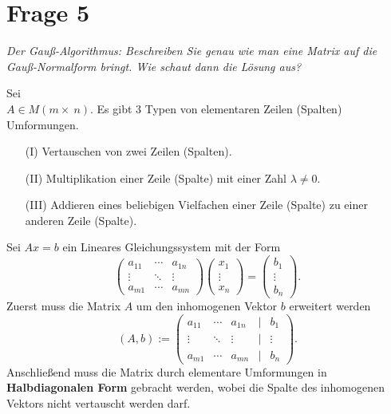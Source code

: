 \section{Frage 5}
\textit{Der Gauß-Algorithmus: Beschreiben Sie genau wie man eine
Matrix auf die Gauß-Normalform bringt. Wie schaut dann die Lösung aus?}

\begin{definition}
    Sei\\ $A\in M(m\times~n)$. Es gibt 3 Typen von elementaren
    Zeilen (Spalten) Umformungen.
    \begin{enumerate}
        \item[(I)] Vertauschen von zwei Zeilen (Spalten).
        \item[(II)] Multiplikation einer Zeile (Spalte) mit einer Zahl 
        $\lambda\neq 0$. 
        \item[(III)] Addieren eines beliebigen Vielfachen einer Zeile (Spalte)
        zu einer anderen Zeile (Spalte).
    \end{enumerate}
\end{definition}

Sei $Ax=b$ ein Lineares Gleichungssystem mit der Form
\[
    \begin{pmatrix}
        a_{11} & \cdots & a_{1n}\\
        \vdots & \ddots & \vdots\\
        a_{m1} & \cdots & a_{mn}
    \end{pmatrix} \begin{pmatrix}
        x_1\\ \vdots\\ x_n
    \end{pmatrix} = \begin{pmatrix}
        b_1\\ \vdots\\ b_n
    \end{pmatrix}
.\]
Zuerst muss die Matrix $A$ um den inhomogenen Vektor $b$ erweitert werden
\[
    (A,b):= \begin{pmatrix}
        a_{11} & \cdots & a_{1n} & \mid & b_1\\
        \vdots & \ddots & \vdots & \mid & \vdots\\
        a_{m1} & \cdots & a_{mn} & \mid & b_n
    \end{pmatrix}
.\]
Anschließend muss die Matrix durch elementare Umformungen in 
\textbf{Halbdiagonalen Form} gebracht werden, wobei die Spalte
des inhomogenen Vektors nicht vertauscht werden darf.

